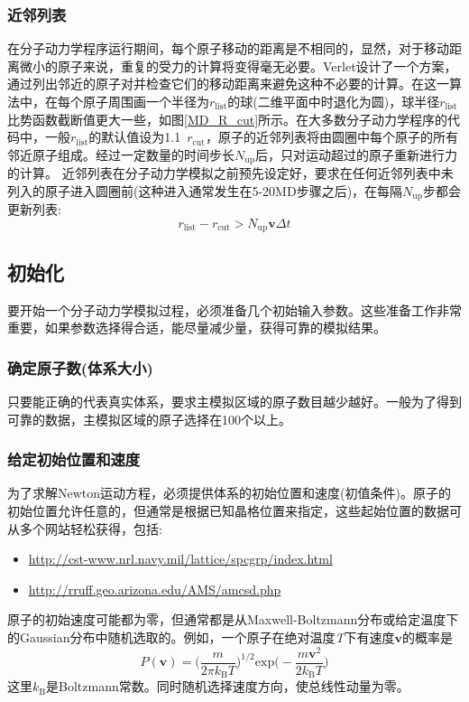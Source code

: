 \subsubsection{近邻列表}
在分子动力学程序运行期间，每个原子移动的距离是不相同的，显然，对于移动距离微小的原子来说，重复的受力的计算将变得毫无必要。\textrm{Verlet}\cite{PR159-98_1967}设计了一个方案，通过列出邻近的原子对并检查它们的移动距离来避免这种不必要的计算。在这一算法中，在每个原子周围画一个半径为$r_{\mathrm{list}}$的球(二维平面中时退化为圆)，球半径$r_{\mathrm{list}}$比势函数截断值更大一些，如图\ref{MD_R_cut}所示。在大多数分子动力学程序的代码中，一般$r_{\mathrm{list}}$的默认值设为1.1~$r_\mathrm{cut}$，原子的近邻列表将由圆圈中每个原子的所有邻近原子组成。经过一定数量的时间步长$N_{\mathrm{up}}$后，只对运动超过的原子重新进行力的计算。
近邻列表在分子动力学模拟之前预先设定好，要求在任何近邻列表中未列入的原子进入圆圈前(这种进入通常发生在5-20\textrm{MD}步骤之后)，在每隔$N_{\mathrm{up}}$步都会更新列表:
\begin{equation}
	r_{\mathrm{list}}-r_{\mathrm{cut}}>N_{\mathrm{up}}\mathbf{v}\Delta t
	\label{eq:r_list_circle}
\end{equation}

\subsection{初始化}
要开始一个分子动力学模拟过程，必须准备几个初始输入参数。这些准备工作非常重要，如果参数选择得合适，能尽量减少量，获得可靠的模拟结果。
\subsubsection{确定原子数(体系大小)}
只要能正确的代表真实体系，要求主模拟区域的原子数目越少越好。一般为了得到可靠的数据，主模拟区域的原子选择在100个以上。
\subsubsection{给定初始位置和速度}
为了求解\textrm{Newton}运动方程，必须提供体系的初始位置和速度(初值条件)。原子的初始位置允许任意的，但通常是根据已知晶格位置来指定，这些起始位置的数据可从多个网站轻松获得，包括:
\begin{itemize}
	\item \url{http://cst-www.nrl.navy.mil/lattice/spcgrp/index.html}
	\item \url{http://rruff.geo.arizona.edu/AMS/amcsd.php}
\end{itemize}
原子的初始速度可能都为零，但通常都是从\textrm{Maxwell-Boltzmann}分布或给定温度下的\textrm{Gaussian}分布中随机选取的。例如，一个原子在绝对温度\textit{T}下有速度$\mathbf{v}$的概率是
\begin{equation}
	P(\mathbf{v})=\bigg(\dfrac{m}{2\pi k_{\mathrm{B}}T}\bigg)^{1/2}\mathrm{exp}\bigg(-\dfrac{m\mathbf{v}^2}{2k_{\mathrm{B}}T}\bigg)
	\label{eq:v-MB}
\end{equation}
这里$k_{\mathrm{B}}$是\textrm{Boltzmann}常数。同时随机选择速度方向，使总线性动量为零。
